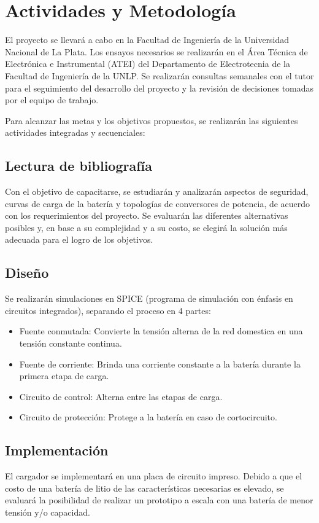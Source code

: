 \section{Actividades y Metodología}


El proyecto se llevará a cabo en la Facultad de Ingeniería de la Universidad Nacional de La Plata.
Los ensayos necesarios se realizarán en el Área Técnica de Electrónica e Instrumental (ATEI)
del Departamento de Electrotecnia de la Facultad de Ingeniería de la UNLP.
Se realizarán consultas semanales con el tutor para el seguimiento del desarrollo del proyecto y la revisión de decisiones tomadas por el equipo de trabajo.

Para alcanzar las metas y los objetivos propuestos, se realizarán las siguientes actividades integradas y secuenciales:

\subsection{Lectura de bibliografía}
Con el objetivo de capacitarse, se estudiarán y analizarán aspectos de seguridad, curvas de carga de la batería 
y topologías de conversores de potencia, de acuerdo con los requerimientos del proyecto. 
Se evaluarán las diferentes alternativas posibles y,
en base a su complejidad y a su costo,
se elegirá la solución más adecuada para el logro de los objetivos. 

\subsection{Diseño}
Se realizarán simulaciones en SPICE (programa de simulación con énfasis en circuitos integrados),
separando el proceso en 4 partes:
\begin{itemize}
    \item Fuente conmutada: Convierte la tensión alterna de la red domestica en una tensión constante continua.
    \item Fuente de corriente: Brinda una corriente constante a la batería durante la primera etapa de carga.
    \item Circuito de control: Alterna entre las etapas de carga.
    \item Circuito de protección: Protege a la batería en caso de cortocircuito.
\end{itemize}

\subsection{Implementación}
El cargador se implementará en una placa de circuito impreso.
Debido a que el costo de una batería de litio de las características necesarias es elevado,
se evaluará la posibilidad de realizar un prototipo a escala con una batería de menor tensión y/o capacidad.

